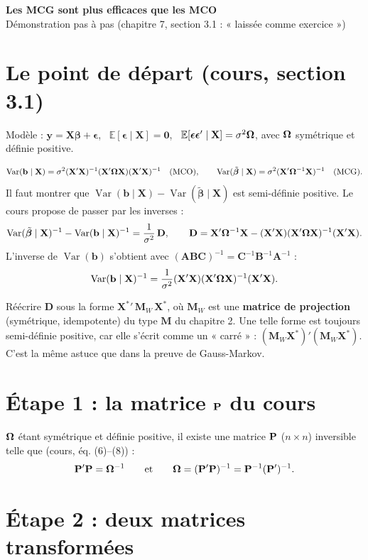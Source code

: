 \documentclass[11pt,a4paper]{article}
\newcommand{\vy}{\mathbf{y}}\newcommand{\vX}{\mathbf{X}}\newcommand{\vb}{\mathbf{b}}\newcommand{\vc}{\mathbf{c}}
\newcommand{\Xs}{\mathbf{X}^{*}}\newcommand{\W}{\mathbf{W}}
\newcommand{\veps}{\bm{\epsilon}}\newcommand{\vbeta}{\bm{\beta}}\newcommand{\tbeta}{\tilde{\bm{\beta}}}
\newcommand{\A}{\mathbf{A}}\newcommand{\B}{\mathbf{B}}\newcommand{\D}{\mathbf{D}}
\newcommand{\Mw}{\mathbf{M}_W}
\newcommand{\Var}{\operatorname{Var}}\newcommand{\E}{\mathbb{E}}
\begin{document}
\begin{center}
{\LARGE\bfseries Les MCG sont plus efficaces que les MCO}\\[6pt]
{\large Démonstration pas à pas (chapitre 7, section 3.1 : « laissée comme exercice »)}
\end{center}

\section*{Le point de départ (cours, section 3.1)}

Modèle : $\vy=\vX\vbeta+\veps$, \ $\E[\veps\mid\vX]=\mathbf 0$, \ $\E[\veps\veps'\mid\vX]=\sigma^2\Om$, avec $\bm{\Omega}$ symétrique et définie positive.

\[
\Var(\vb\mid\vX)=\sigma^2(\vX'\vX)^{-1}(\vX'\Om\vX)(\vX'\vX)^{-1}\quad\text{(MCO)},\qquad
\Var(\tbeta\mid\vX)=\sigma^2(\vX'\Om^{-1}\vX)^{-1}\quad\text{(MCG)}.
\]
Il faut montrer que $\Var(\vb\mid\vX)-\Var(\tbeta\mid\vX)$ est semi-définie positive. Le cours propose de passer par les inverses :
\[
\Var(\tbeta\mid\vX)^{-1}-\Var(\vb\mid\vX)^{-1}=\frac1{\sigma^2}\,\D,\qquad
\D=\vX'\Om^{-1}\vX-(\vX'\vX)(\vX'\Om\vX)^{-1}(\vX'\vX).
\]
L'inverse de $\Var(\vb)$ s'obtient avec $(\A\B\mathbf C)^{-1}=\mathbf C^{-1}\B^{-1}\A^{-1}$ :
\[
\Var(\vb\mid\vX)^{-1}=\frac1{\sigma^2}(\vX'\vX)(\vX'\Om\vX)^{-1}(\vX'\vX).
\]

\begin{idee}
Réécrire $\D$ sous la forme $\Xs{}'\,\Mw\,\Xs$, où $\Mw$ est une \textbf{matrice de projection} (symétrique, idempotente) du type $\mathbf M$ du chapitre 2. Une telle forme est toujours semi-définie positive, car elle s'écrit comme un « carré » : $(\Mw\Xs)'(\Mw\Xs)$. C'est la même astuce que dans la preuve de Gauss-Markov.
\end{idee}

\section*{Étape 1 : la matrice $\mathbf{P}$ du cours}

$\bm{\Omega}$ étant symétrique et définie positive, il existe une matrice $\mathbf{P}$ ($n\times n$) inversible telle que (cours, éq. (6)--(8)) :
\[
\mathbf{P}'\mathbf{P}=\bm{\Omega}^{-1}\qquad\text{et}\qquad \bm{\Omega}=(\mathbf{P}'\mathbf{P})^{-1}=\mathbf{P}^{-1}(\mathbf{P}')^{-1}.
\]

\section*{Étape 2 : deux matrices transformées}
\end{document}
